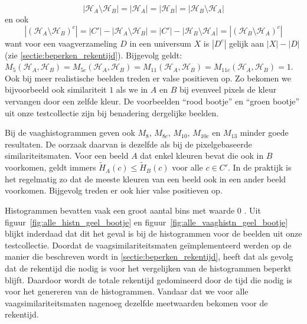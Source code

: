 \begin{displaymath}
|\mathcal{H}_A \setminus \mathcal{H}_B|=|\mathcal{H}_A|=|\mathcal{H}_B|=|\mathcal{H}_B \setminus \mathcal{H}_A|
\end{displaymath}
en ook
\begin{displaymath}
|(\mathcal{H}_A  \setminus \mathcal{H}_B)^c|=|C'|-|\mathcal{H}_A \setminus \mathcal{H}_B|=|C'|-|\mathcal{H}_B \setminus \mathcal{H}_A|=|(\mathcal{H}_B  \setminus \mathcal{H}_A)^c|
\end{displaymath}
want voor een vaagverzameling $D$ in een universum $X$ is $|D^c|$ gelijk aan $|X|-|D|$ (zie \ref{sectie:beperken_rekentijd}). Bijgevolg geldt:
$M_5(\mathcal{H}_A,\mathcal{H}_B)=M_{5c}(\mathcal{H}_A,\mathcal{H}_B)=M_{11}(\mathcal{H}_A,\mathcal{H}_B)=M_{11c}(\mathcal{H}_A,\mathcal{H}_B)=1$.
Ook bij meer realistische beelden treden er valse positieven op. Zo bekomen 
we bijvoorbeeld ook similariteit $1$ als we in $A$ en $B$ bij evenveel pixels de kleur vervangen door 
een zelfde kleur. De voorbeelden ``rood bootje'' en ``groen bootje'' uit onze testcollectie zijn bij 
benadering dergelijke beelden. 

Bij de vaaghistogrammen geven ook $M_8$, $M_{8c}$, $M_{10}$, $M_{10c}$ en $M_{13}$ minder goede resultaten.
De oorzaak daarvan is dezelfde als bij de pixelgebaseerde similariteitsmaten. Voor een beeld $A$ dat enkel
kleuren bevat die ook in $B$ voorkomen, geldt immers $\widetilde{H}_A(c) \leq \widetilde{H}_B(c)$ voor 
alle $c \in C'$. In de praktijk is het regelmatig zo dat de meeste kleuren van een beeld ook in een
ander beeld voorkomen. Bijgevolg treden er ook hier valse positieven op.

Histogrammen bevatten vaak een groot aantal bins met waarde $0$ \cite{berens:compressed_colour_histograms}. Uit 
figuur~\ref{fig:alle_histn_geel_bootje} en figuur~\ref{fig:alle_vaaghistn_geel_bootje} blijkt 
inderdaad dat dit het geval is bij de histogrammen voor de beelden uit onze testcollectie. 
Doordat de vaagsimilariteitsmaten ge\"implementeerd werden op de manier die beschreven wordt in 
\ref{sectie:beperken_rekentijd}, heeft dat als gevolg dat de rekentijd die nodig is voor het 
vergelijken van de histogrammen beperkt blijft. Daardoor wordt de totale rekentijd gedomineerd door 
de tijd die nodig is voor het genereren van de histogrammen. Vandaar dat we voor alle 
vaagsimilariteitsmaten nagenoeg dezelfde meetwaarden bekomen voor de rekentijd. 


